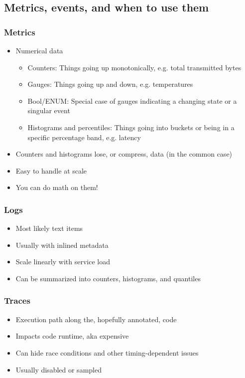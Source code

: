 \documentclass[aspectratio=169]{beamer}
\begin{document}
\subsection{Metrics, events, and when to use them}

\begin{frame}
	\frametitle{Metrics}
	\begin{itemize}
		\item Numerical data
		\begin{itemize}
			\item Counters: Things going up monotonically, e.g. total transmitted bytes
			\item Gauges: Things going up and down, e.g. temperatures
			\item Bool/ENUM: Special case of gauges indicating a changing state or a singular event
			\item Histograms and percentiles: Things going into buckets or being in a specific percentage band, e.g. latency
		\end{itemize}
		\item Counters and histograms lose, or compress, data (in the common case)
		\item Easy to handle at scale
		\item You can do math on them!
	\end{itemize}
\end{frame}


\begin{frame}
	\frametitle{Logs}
	\begin{itemize}
		\item Most likely text items
		\item Usually with inlined metadata
		\item Scale linearly with service load
		\item Can be summarized into counters, histograms, and quantiles
	\end{itemize}
\end{frame}

\begin{frame}
	\frametitle{Traces}
	\begin{itemize}
		\item Execution path along the, hopefully annotated, code
		\item Impacts code runtime, aka expensive
		\item Can hide race conditions and other timing-dependent issues
		\item Usually disabled or sampled
	\end{itemize}
\end{frame}
\end{document}
